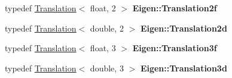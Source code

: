 \begin{DoxyCompactItemize}
typedef \mbox{\hyperlink{class_eigen_1_1_translation}{Translation}}$<$ float, 2 $>$ {\bfseries Eigen\+::\+Translation2f}
\item 
\mbox{\label{group___geometry___module_ga611549c26e2374da5150256a470feb61}} 
typedef \mbox{\hyperlink{class_eigen_1_1_translation}{Translation}}$<$ double, 2 $>$ {\bfseries Eigen\+::\+Translation2d}
\item 
\mbox{\label{group___geometry___module_ga61b011af1488e1232c77dc196297f42f}} 
typedef \mbox{\hyperlink{class_eigen_1_1_translation}{Translation}}$<$ float, 3 $>$ {\bfseries Eigen\+::\+Translation3f}
\item 
\mbox{\label{group___geometry___module_ga987897fa4f21a500ab9fb788e581c933}} 
typedef \mbox{\hyperlink{class_eigen_1_1_translation}{Translation}}$<$ double, 3 $>$ {\bfseries Eigen\+::\+Translation3d}
\end{DoxyCompactItemize}
